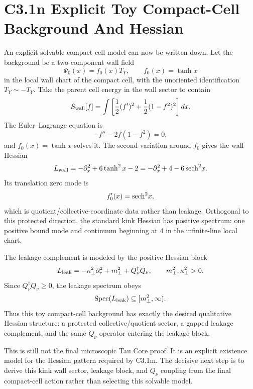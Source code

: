\documentclass[11pt]{article}
\begin{document}
\section{C3.1n Explicit Toy Compact-Cell Background And Hessian}
An explicit solvable compact-cell model can now be written down.  Let the
background be a two-component wall field
\begin{equation}
\Psi_0(x)=f_0(x)T_Y,\qquad f_0(x)=\tanh x
\end{equation}
in the local wall chart of the compact cell, with the unoriented identification
$T_Y\sim -T_Y$.  Take the parent cell energy in the wall sector to contain
\begin{equation}
S_{\rm wall}[f]
=\int\left[\frac12(f')^2+\frac12(1-f^2)^2\right]dx .
\end{equation}
The Euler--Lagrange equation is
\begin{equation}
-f''-2f(1-f^2)=0,
\end{equation}
and $f_0(x)=\tanh x$ solves it.  The second variation around $f_0$ gives the
wall Hessian
\begin{equation}
L_{\rm wall}
=-\partial_x^2+6\tanh^2x-2
=-\partial_x^2+4-6\,{\rm sech}^2x .
\end{equation}
Its translation zero mode is
\begin{equation}
f_0'(x)={\rm sech}^2x,
\end{equation}
which is quotient/collective-coordinate data rather than leakage.  Orthogonal
to this protected direction, the standard kink Hessian has positive spectrum:
one positive bound mode and continuum beginning at $4$ in the infinite-line
local chart.

The leakage complement is modeled by the positive Hessian block
\begin{equation}
L_{\rm leak}
=-\kappa_\perp^2\partial_r^2+m_\perp^2+Q_\nu^\dagger Q_\nu,
\qquad
m_\perp^2,\kappa_\perp^2>0 .
\end{equation}
Since $Q_\nu^\dagger Q_\nu\geq0$, the leakage spectrum obeys
\begin{equation}
{\rm Spec}(L_{\rm leak})\subseteq[m_\perp^2,\infty).
\end{equation}
Thus this toy compact-cell background has exactly the desired qualitative
Hessian structure: a protected collective/quotient sector, a gapped leakage
complement, and the same $Q_\nu$ operator entering the leakage block.

This is still not the final microscopic Tau Core proof.  It is an explicit
existence model for the Hessian pattern required by C3.1m.  The decisive next
step is to derive this kink wall sector, leakage block, and $Q_\nu$ coupling
from the final compact-cell action rather than selecting this solvable model.
\end{document}
